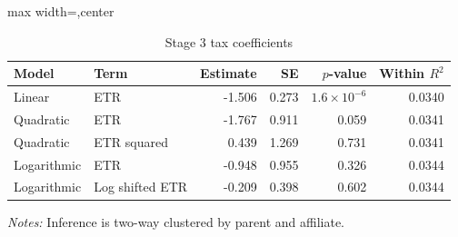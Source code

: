 \begin{table}[H]
\centering
\scriptsize
\caption{Stage 3 tax coefficients}
\label{tab:app_stage3_tax_coefficients}
\begin{adjustbox}{max width=\textwidth,center}
\begin{tabular}{@{}llrrrr@{}}
\toprule
Model & Term & Estimate & SE & $p$-value & Within $R^2$ \\
\midrule
Linear & ETR & -1.506 & 0.273 & $1.6 \times 10^{-6}$ & 0.0340 \\
Quadratic & ETR & -1.767 & 0.911 & 0.059 & 0.0341 \\
Quadratic & ETR squared &  0.439 & 1.269 & 0.731 & 0.0341 \\
Logarithmic & ETR & -0.948 & 0.955 & 0.326 & 0.0344 \\
Logarithmic & Log shifted ETR & -0.209 & 0.398 & 0.602 & 0.0344 \\
\bottomrule
\end{tabular}
\end{adjustbox}

\vspace{0.5em}
\begin{minipage}{0.96\textwidth}
\footnotesize\raggedright \textit{Notes:} Inference is two-way clustered by parent and affiliate.
\end{minipage}
\end{table}

